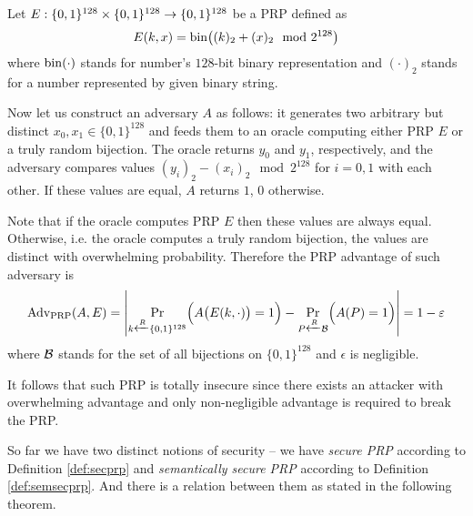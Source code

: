 \begin{example}
	Let $E:\{0,1\}^{128}\times\{0,1\}^{128}\rightarrow\{0,1\}^{128}$ be a PRP defined as
	\[
		E(k,x) = \operatorname*{bin}\bigl((k)_2 + (x)_2 \mod{2^{128}}\bigr)
	\]
	where $\operatorname*{bin}(\cdot)$ stands for number's $128$-bit binary representation and $(\cdot)_2$ stands for a number represented by given binary string.
	
	Now let us construct an adversary $A$ as follows: it generates two arbitrary but distinct $x_0,x_1\in\{0,1\}^{128}$ and feeds them to an oracle computing either PRP $E$ or a truly random bijection. The oracle returns $y_0$ and $y_1$, respectively, and the adversary compares values $(y_i)_2 - (x_i)_2 \mod{2^{128}}$ for $i=0,1$ with each other. If these values are equal, $A$ returns $1$, $0$ otherwise.
	
	Note that if the oracle computes PRP $E$ then these values are always equal. Otherwise, i.e. the oracle computes a truly random bijection, the values are distinct with overwhelming probability. Therefore the PRP advantage of such adversary is
	\[
		\operatorname*{Adv_{PRP}}(A,E) = \left| \Pr\limits_{k\xleftarrow{R} \{0,1\}^{128}}\Bigl(A\bigl(E(k,\cdot)\bigr)=1\Bigr) - \Pr\limits_{P\xleftarrow{R} {\cal B}}\Bigl(A(P)=1\Bigr) \right| = 1 - \varepsilon
	\]
	where $\cal B$ stands for the set of all bijections on $\{0,1\}^{128}$ and $\epsilon$ is negligible.
	
	It follows that such PRP is totally insecure since there exists an attacker with overwhelming advantage and only non-negligible advantage is required to break the PRP.
\end{example}

So far we have two distinct notions of security -- we have {\em secure PRP} according to Definition \ref{def:secprp} and {\em semantically secure PRP} according to Definition \ref{def:semsecprp}. And there is a relation between them as stated in the following theorem.

